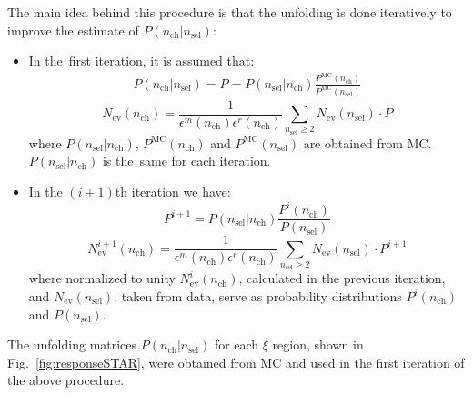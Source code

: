 \noindent The main idea behind this procedure is that the unfolding  is done iteratively to improve the estimate of $P(n_\textrm{ch}|n_\textrm{sel})$:
\begin{itemize}
	\item In the~first iteration, it is assumed that: \\
	\begin{eqnarray}
	P(n_\textrm{ch}|n_\textrm{sel}) = P = P(n_\textrm{sel}|n_\textrm{ch})\frac{P^\textrm{MC}(n_\textrm{ch})}{P^\textrm{MC}(n_\textrm{sel})}
	\end{eqnarray}
	\begin{equation}
	N_\textrm{ev}(n_\textrm{ch})=\frac{1}{\epsilon^{m}(n_\textrm{ch})\epsilon^{r}(n_\textrm{ch})}\sum_{n_\textrm{sel}\geq2}N_\textrm{ev}(n_\textrm{sel})\cdot P
	\end{equation}
	where $P(n_\textrm{sel}|n_\textrm{ch})$, $P^\textrm{MC}(n_\textrm{ch})$ and $P^\textrm{MC}(n_\textrm{sel})$ are obtained from MC. $P(n_\textrm{sel}|n_\textrm{ch})$ is the~same for each iteration.
	
	\item In the $(i+1)$th iteration we have:
	\begin{equation}
	P^{i+1}=P(n_\textrm{sel}|n_\textrm{ch})\frac{P^{i}(n_\textrm{ch})}{P(n_\textrm{sel})}
	\end{equation}
	\begin{equation}
	N_\textrm{ev}^{i+1}(n_\textrm{ch})=\frac{1}{\epsilon^{m}(n_\textrm{ch})\epsilon^{r}(n_\textrm{ch})}\sum_{n_\textrm{sel}\geq2}N_\textrm{ev}(n_\textrm{sel})\cdot P^{i+1}
	\end{equation}
	where normalized to unity $N_\textrm{ev}^i(n_\textrm{ch})$, calculated in the previous iteration, and $N_\textrm{ev}(n_\textrm{sel})$, taken from data, serve as probability distributions $P^{i}(n_\textrm{ch})$ and $P(n_\textrm{sel})$.
\end{itemize}

The  unfolding matrices $P(n_\textrm{ch}|n_\textrm{sel})$  for each $\xi$ region, shown in Fig.~\ref{fig:responseSTAR}, were obtained from MC and used in the first iteration of the above procedure. 


